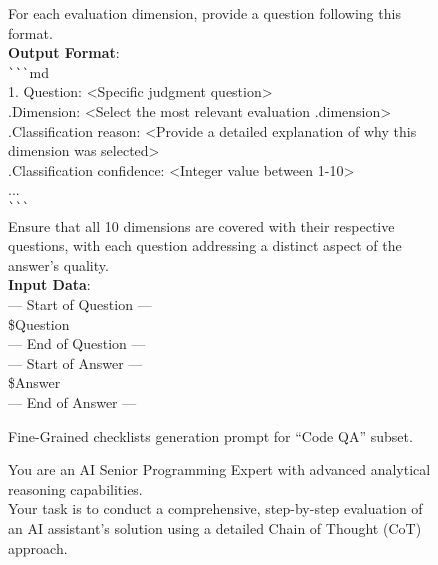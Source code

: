 \documentclass[11pt, a4paper, logo, copyright, nonumbering, amsart]{map}
\begin{document}
\begin{CJK*}{UTF8}{gbsn}
\begin{figure*}[h!]
\begin{center}
\begin{tcolorbox}[width=1\textwidth, colback=lightblue, title={\textbf{Fine-Grained Checklists Generation Prompt for ``Code QA'' Subset}}]
    For each evaluation dimension, provide a question following this format.\\
    \textbf{Output Format}:\\
    \verb|```|md\\
    1. Question: <Specific judgment question>\\
    .\;\;\;Dimension: <Select the most relevant evaluation .\;\;\;dimension>\\
    .\;\;\;Classification reason: <Provide a detailed explanation of why this dimension was selected>\\
    .\;\;\;Classification confidence: <Integer value between 1-10>\\
    ...\\
    \verb|```|\\
    
    Ensure that all 10 dimensions are covered with their respective questions, with each question addressing a distinct aspect of the answer's quality.\\

    \textbf{Input Data}:\\
    --- Start of Question ---\\
    \textcolor{ora}{\$Question}\\
    --- End of Question ---\\
    
    --- Start of Answer ---\\
    \textcolor{ora}{\$Answer}\\
    --- End of Answer ---\\
    \end{tcolorbox}
\end{center}
\caption{Fine-Grained checklists generation prompt for ``Code QA'' subset.} \label{ap:prompt_real_diy_qa}
\end{figure*}

\begin{figure*}[h!]
\begin{center}
    \fontsize{8.4}{8.4} \selectfont
    \begin{tcolorbox}[width=1\textwidth, colback=lightblue, title={\textbf{Basic Critique Evaluation Prompt (with CoT)}}]

    You are an AI Senior Programming Expert with advanced analytical reasoning capabilities.\\
    
    Your task is to conduct a comprehensive, step-by-step evaluation of an AI assistant's solution using a detailed Chain of Thought (CoT) approach.\\
    

\end{tcolorbox}
\end{center}
\end{figure*}
\end{CJK*}
\end{document}
